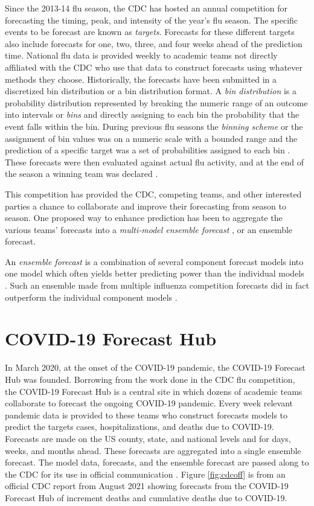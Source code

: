 \documentclass[11pt,notitlepage]{isuthesis}
\begin{document}
Since the 2013-14 flu season, the CDC has hosted an annual competition for 
forecasting the timing, peak, and intensity of the year's flu 
season. The specific events to be forecast are known as \emph{targets}.
Forecasts
for these different targets also include forecasts for one, two, three, and 
four weeks ahead of the prediction time. National flu data is provided weekly 
to academic teams not directly affiliated with the CDC who use that data to 
construct forecasts using 
whatever methods they choose. Historically, the forecasts have been
submitted 
in a discretized bin distribution or a bin distribution
format. A \emph{bin distribution} is a probability distribution represented by
breaking the numeric range of an outcome into intervals or \emph{bins} and
directly assigning to each bin the probability that the event falls 
within the bin.
During previous flu seasons the \emph{binning scheme} or the assignment of 
bin values was on a numeric 
scale with a bounded range and the 
prediction of a specific target was a set of probabilities assigned to each bin
\cite[]{mcgowan2019collaborative}.
These forecasts were then evaluated against actual flu activity, and at 
the end of the season a winning team was declared \cite[]{cdcflusight}.

This competition has provided the CDC, competing teams, and other interested
parties a chance to collaborate and improve their forecasting from season to
season. One 
proposed way to enhance prediction has been to aggregate the various teams'
forecasts into a \emph{multi-model ensemble forecast} 
\cite[]{mcgowan2019collaborative,mcandrew2019adaptively,reich2019accuracy},
or an ensemble forecast.

An \emph{ensemble forecast} is a combination of several component forecast 
models into one model which often yields better predicting power than the 
individual models \cite[]{cramer2021evaluation}. Such an ensemble made from 
multiple influenza competition forecasts did in fact outperform the individual 
component models \cite[]{reich2019accuracy}.



\section{COVID-19 Forecast Hub}
In March 2020, at the onset of the COVID-19 pandemic, the COVID-19 Forecast Hub
was founded. Borrowing from the work done in the CDC flu competition, the 
COVID-19 Forecast Hub is a central site in 
which dozens of academic teams collaborate to forecast the ongoing COVID-19 
pandemic.
Every week relevant
pandemic data is provided to these teams who construct forecasts models to 
predict the targets cases, hospitalizations, and deaths due to COVID-19. 
Forecasts are 
made on the US county,
state, and national levels and for days, weeks, and months ahead.
These forecasts are aggregated into a single ensemble forecast. The model data,
forecasts, and the ensemble forecast are passed along to the CDC for its use in 
official
communication \cite[]{Cramer2021-hub-dataset}. Figure \ref{fig:cdcoff} is from 
an 
official CDC report from August 2021 showing forecasts from the COVID-19 
Forecast Hub of increment deaths and cumulative deaths due to COVID-19.
\end{document}
